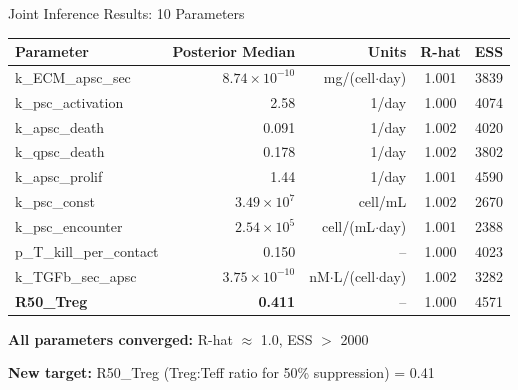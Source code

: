 \documentclass[aspectratio=169,10pt]{beamer}
\begin{document}
\begin{frame}{Joint Inference Results: 10 Parameters}
\begin{table}
\centering
\scriptsize
\begin{tabular}{lrrcc}
\toprule
\textbf{Parameter} & \textbf{Posterior Median} & \textbf{Units} & \textbf{R-hat} & \textbf{ESS} \\
\midrule
k\_ECM\_apsc\_sec & $8.74 \times 10^{-10}$ & mg/(cell$\cdot$day) & 1.001 & 3839 \\
k\_psc\_activation & 2.58 & 1/day & 1.000 & 4074 \\
k\_apsc\_death & 0.091 & 1/day & 1.002 & 4020 \\
k\_qpsc\_death & 0.178 & 1/day & 1.002 & 3802 \\
k\_apsc\_prolif & 1.44 & 1/day & 1.001 & 4590 \\
k\_psc\_const & $3.49 \times 10^{7}$ & cell/mL & 1.002 & 2670 \\
k\_psc\_encounter & $2.54 \times 10^{5}$ & cell/(mL$\cdot$day) & 1.001 & 2388 \\
p\_T\_kill\_per\_contact & 0.150 & -- & 1.000 & 4023 \\
k\_TGFb\_sec\_apsc & $3.75 \times 10^{-10}$ & nM$\cdot$L/(cell$\cdot$day) & 1.002 & 3282 \\
\textbf{R50\_Treg} & \textbf{0.411} & -- & 1.000 & 4571 \\
\bottomrule
\end{tabular}
\end{table}

\vspace{0.5em}
\textbf{All parameters converged:} R-hat $\approx$ 1.0, ESS $>$ 2000

\textbf{New target:} R50\_Treg (Treg:Teff ratio for 50\% suppression) = 0.41
\end{frame}
\end{document}

